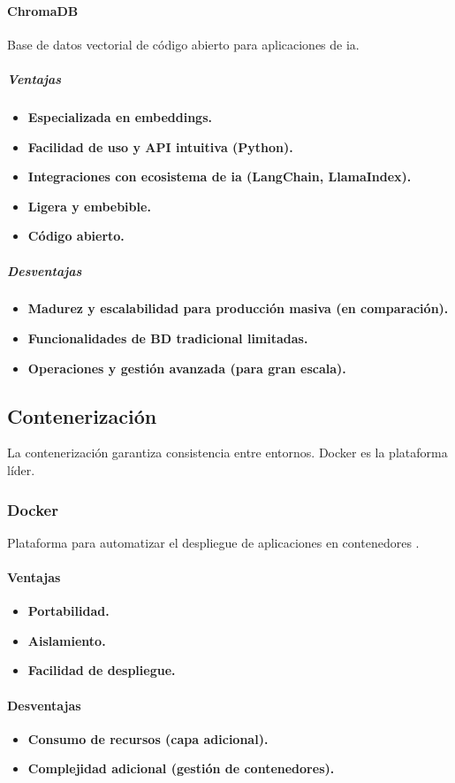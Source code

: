 \paragraph{ChromaDB}
Base de datos vectorial de código abierto para aplicaciones de \gls{ia}.
\subparagraph{Ventajas}
\begin{itemize}
    \item \textbf{Especializada en embeddings.}
    \item \textbf{Facilidad de uso y API intuitiva (Python).}
    \item \textbf{Integraciones con ecosistema de \gls{ia} (LangChain, LlamaIndex).}
    \item \textbf{Ligera y embebible.}
    \item \textbf{Código abierto.}
\end{itemize}
\subparagraph{Desventajas}
\begin{itemize}
    \item \textbf{Madurez y escalabilidad para producción masiva (en comparación).}
    \item \textbf{Funcionalidades de BD tradicional limitadas.}
    \item \textbf{Operaciones y gestión avanzada (para gran escala).}
\end{itemize}

\subsection{Contenerización}
La contenerización garantiza consistencia entre entornos. Docker es la plataforma líder.
\subsubsection{Docker}
Plataforma para automatizar el despliegue de aplicaciones en contenedores \cite{noauthor_home_0800}.
\paragraph{Ventajas}
\begin{itemize}
    \item \textbf{Portabilidad.}
    \item \textbf{Aislamiento.}
    \item \textbf{Facilidad de despliegue.}
\end{itemize}
\paragraph{Desventajas}
\begin{itemize}
    \item \textbf{Consumo de recursos (capa adicional).}
    \item \textbf{Complejidad adicional (gestión de contenedores).}
\end{itemize}

